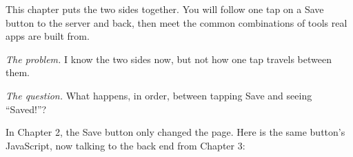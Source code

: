 \label{ch:webapp-04}

\chapterrule

This chapter puts the two sides together. You will follow one tap on a Save button to the server and back, then meet the common combinations of tools real apps are built from.

\emph{The problem.} I know the two sides now, but not how one tap travels between them.

\emph{The question.} What happens, in order, between tapping Save and seeing ``Saved!''?

\label{webapp-04:the-button-now-for-real}

In Chapter 2, the Save button only changed the page. Here is the same button's JavaScript, now talking to the back end from Chapter 3:

\begin{codebox}[short]

\begin{Shaded}
\begin{Highlighting}[]
 \OperatorTok{=}  \NormalTok{ () \{}
  \OperatorTok{=}  \NormalTok{(}\OperatorTok{,}\NormalTok{ \{}
    \OperatorTok{:} \OperatorTok{,}
    \OperatorTok{:}\NormalTok{ \{}\OperatorTok{:} \NormalTok{\}}\OperatorTok{,}
    \OperatorTok{:} \NormalTok{(\{}\OperatorTok{:} \NormalTok{\})}\OperatorTok{,}
\NormalTok{  \})}\OperatorTok{;}
  \OperatorTok{=} \NormalTok{()}\OperatorTok{;}
  \NormalTok{(}\NormalTok{)} \OperatorTok{=}
     \OperatorTok{+}\OperatorTok{;}
\NormalTok{\}}\OperatorTok{;}
\end{Highlighting}
\end{Shaded}

\end{codebox}

